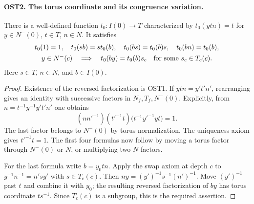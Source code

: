 \paragraph{OST2. The torus coordinate and its congruence variation.}
\label{claim:OST2}
There is a well-defined function $t_0:I(0)\to T$ characterized by
$t_0(y t n)=t$ for $y\in N^-(0)$, $t\in T$, $n\in N$.
It satisfies
\begin{gather}
 t_0(1)=1,\quad t_0(sb)=s t_0(b),\quad
 t_0(bs)=t_0(b)s,\quad t_0(bn)=t_0(b),\\
 y\in N^-(c)\quad\Longrightarrow\quad
 t_0(by)=t_0(b)s_c\quad\hbox{for some }s_c\in T_c(c).
 \label{eq:ost-torus}
\end{gather}
Here $s\in T$, $n\in N$, and $b\in I(0)$.
\begin{proof}
Existence of the reversed factorization is OST1.  If
$ytn=y't'n'$, rearranging gives an identity with successive factors
in $N_f,T_f,N^-(0)$.  Explicitly, from
$n=t^{-1}y^{-1}y't'n'$ one obtains
\[
 (nn'^{-1})(t'^{-1}t)
           \bigl(t^{-1}y'^{-1}yt\bigr)=1.
\]
The last factor belongs to $N^-(0)$ by torus normalization.
The uniqueness axiom gives $t'^{-1}t=1$.
The first four formulas now follow by moving a torus factor through
$N^-(0)$ or $N$, or multiplying two $N$ factors.

For the last formula write $b=y_0tn$.  Apply the swap axiom at
depth $c$ to $y^{-1}n^{-1}=n'sy'$ with $s\in T_c(c)$.
Then $ny=(y')^{-1}s^{-1}(n')^{-1}$.  Move $(y')^{-1}$
past $t$ and combine it with $y_0$; the resulting reversed
factorization of $by$ has torus coordinate $ts^{-1}$.
Since $T_c(c)$ is a subgroup, this is the required assertion.
\end{proof}

